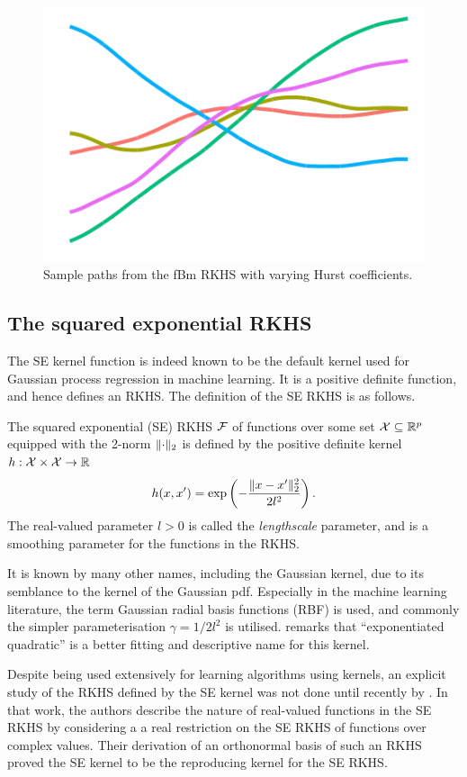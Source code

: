 \begin{figure}[hbt]
  \includegraphics[scale=0.4]{figure/kernel_path_fbm_07_th}
  \caption{Sample paths from the fBm RKHS with varying Hurst coefficients.}
\end{figure}

\subsection{The squared exponential RKHS}

The \gls{SE} kernel function is indeed known to be the default kernel used for Gaussian process regression in machine learning.
It is a positive definite function, and hence defines an RKHS.
The definition of the \gls{SE} RKHS is as follows.

\begin{definition}
  The squared exponential (SE) RKHS ${\mathcal F}$ of functions over some set ${\mathcal X} \subseteq \mathbb{R}^p$ equipped with the 2-norm $\lVert\cdot\rVert_2$ is defined by the positive definite kernel $h:{\mathcal X}\times{\mathcal X}\to\mathbb{R}$ 
  \[
    h(x,x') = \exp\left(-\frac{\lVert x-x'\rVert_2^2}{2l^2} \right).
  \]
  The real-valued parameter $l > 0$ is called the \emph{lengthscale} parameter, and is a smoothing parameter for the functions in the RKHS.
\end{definition}

It is known by many other names, including the Gaussian kernel, due to its semblance to the kernel of the Gaussian pdf. 
Especially in the machine learning literature, the term Gaussian radial basis functions (RBF) is used, and commonly the simpler parameterisation $\gamma = 1 / 2l^2$ is utilised.
\citet{duvenaud2014automatic} remarks that ``exponentiated quadratic'' is a better fitting and descriptive name for this kernel.

Despite being used extensively for learning algorithms using kernels, an explicit study of the RKHS defined by the SE kernel was not done until recently by \citet{steinwart2006explicit}.
In that work, the authors describe the nature of real-valued functions in the SE RKHS by considering a a real restriction on the SE RKHS of functions over complex values.
Their derivation of an orthonormal basis of such an RKHS proved the SE kernel to be the reproducing kernel for the SE RKHS.

